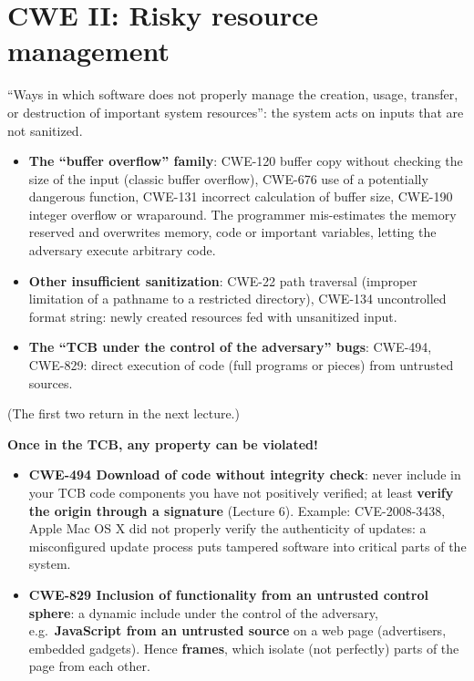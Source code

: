 \section{CWE II: Risky resource management}

\begin{defnbox}[title={Risky resource management}]
``Ways in which software does not properly manage the creation, usage, transfer, or destruction of
important system resources'': the system acts on inputs that are not sanitized.
\begin{itemize}
  \item \textbf{The ``buffer overflow'' family}: CWE-120 buffer copy without checking the size of
        the input (classic buffer overflow), CWE-676 use of a potentially dangerous function,
        CWE-131 incorrect calculation of buffer size, CWE-190 integer overflow or wraparound. The
        programmer mis-estimates the memory reserved and overwrites memory, code or important
        variables, letting the adversary execute arbitrary code.
  \item \textbf{Other insufficient sanitization}: CWE-22 path traversal (improper limitation of a
        pathname to a restricted directory), CWE-134 uncontrolled format string: newly created
        resources fed with unsanitized input.
  \item \textbf{The ``TCB under the control of the adversary'' bugs}: CWE-494, CWE-829: direct
        execution of code (full programs or pieces) from untrusted sources.
\end{itemize}
(The first two return in the next lecture.)
\end{defnbox}

\begin{warnbox}[title={The TCB under the control of the adversary}]
\textbf{Once in the TCB, any property can be violated!}
\begin{itemize}
  \item \textbf{CWE-494 Download of code without integrity check}: never include in your TCB code
        components you have not positively verified; at least \textbf{verify the origin through a
        signature} (Lecture 6). Example: CVE-2008-3438, Apple Mac OS X did not properly verify
        the authenticity of updates: a misconfigured update process puts tampered software into
        critical parts of the system.
  \item \textbf{CWE-829 Inclusion of functionality from an untrusted control sphere}: a dynamic
        include under the control of the adversary, e.g.\ \textbf{JavaScript from an untrusted
        source} on a web page (advertisers, embedded gadgets). Hence \textbf{frames}, which isolate
        (not perfectly) parts of the page from each other.
\end{itemize}
\end{warnbox}

